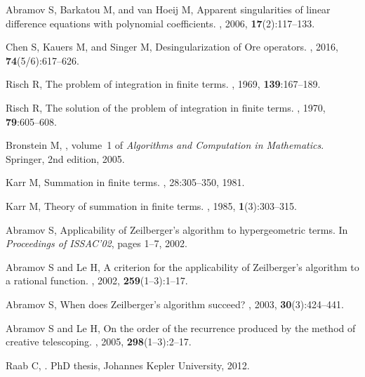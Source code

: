 \documentclass{jssc}
\begin{document}
\begin{thebibliography}{100}
 Abramov S,   Barkatou M, and van Hoeij M,
\newblock Apparent singularities of linear difference equations with polynomial
  coefficients.
,
  2006, {\bf 17}(2):117--133.

Chen S, Kauers M, and Singer M,
\newblock Desingularization of {O}re operators.
, 2016, {\bf 74}(5/6):617--626.

Risch R,
\newblock The problem of integration in finite terms.
,
 1969, {\bf 139}:167--189.

Risch R,
\newblock The solution of the problem of integration in finite terms.
, 1970, {\bf 79}:605--608.

Bronstein M,
, volume~1 of {\it Algorithms and
  Computation in Mathematics}.
\newblock Springer, 2nd edition, 2005.

Karr M,
\newblock Summation in finite terms.
, 28:305--350, 1981.

Karr M,
\newblock Theory of summation in finite terms.
, 1985, {\bf 1}(3):303--315.

Abramov S,
\newblock Applicability of {Z}eilberger's algorithm to hypergeometric terms.
\newblock In {\it Proceedings of ISSAC'02}, pages 1--7, 2002.

Abramov S and Le H,
\newblock A criterion for the applicability of {Z}eilberger's algorithm to a
  rational function.
, 2002, {\bf 259}(1--3):1--17.

Abramov S,
\newblock When does {Z}eilberger's algorithm succeed?
, 2003, {\bf 30}(3):424--441.

Abramov S and Le H,
\newblock On the order of the recurrence produced by the method of creative
  telescoping.
, 2005, {\bf 298}(1--3):2--17.

Raab C,
.
\newblock PhD thesis, Johannes Kepler University, 2012.


\end{thebibliography}
\end{document}
